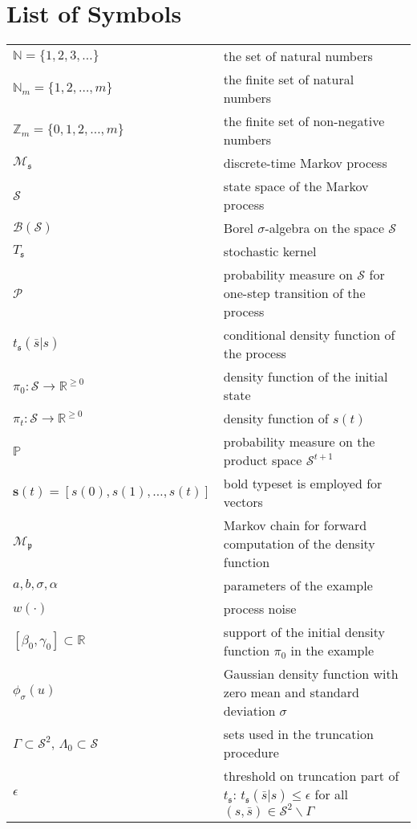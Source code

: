 \documentclass{LMCS}
\begin{document}
\section{List of Symbols}
\begin{longtable}{lp{10.5cm}}
$\mathbb N  = \{1,2,3,\ldots\}$& the set of natural numbers\\
$\mathbb N_m = \{1,2,\ldots,m\}$& the finite set of natural numbers\\
$\mathbb Z_m = \{0,1,2,\ldots,m\}$& the finite set of non-negative numbers\\
$\mathscr M_{\mathfrak s}$ &  discrete-time Markov process\\
$\mathcal S$ & state space of the Markov process\\
$\mathcal B(\mathcal S)$ & Borel $\sigma$-algebra on the space $\mathcal S$\\
$T_{\mathfrak s}$ & stochastic kernel\\
$\mathcal P$ & probability measure on $\mathcal S$ for one-step transition of the process\\
$t_{\mathfrak s}(\bar s|s)$& conditional density function of the process\\
$\pi_0:\mathcal S\rightarrow \mathbb R^{\ge 0}$& density function of the initial state\\
$\pi_t:\mathcal S\rightarrow \mathbb R^{\ge 0}$& density function of $s(t)$\\
$\mathbb P$& probability measure on the product space $\mathcal S^{t+1}$\\
$\mathbf s(t) = \left[s(0),s(1),\ldots,s(t)\right]$& bold typeset is employed for vectors\\
$\mathscr M_{\mathfrak p}$& Markov chain for forward computation of the density function\\
$a,b,\sigma,\alpha$& parameters of the example\\
$w(\cdot)$& process noise\\
$[\beta_0,\gamma_0]\subset\mathbb R$& support of the initial density function $\pi_0$ in the example\\
$\phi_{\sigma}(u)$& Gaussian density function with zero mean and standard deviation $\sigma$\\
$\varGamma\subset\mathcal S^2,\,\Lambda_0\subset\mathcal S$& sets used in the truncation procedure\\
$\epsilon$ & threshold on truncation part of $t_{\mathfrak s}$: $t_{\mathfrak s}(\bar s|s)\le \epsilon$ for all $(s,\bar s)\in\mathcal S^2\backslash\varGamma$\\

\end{longtable}
\end{document}

